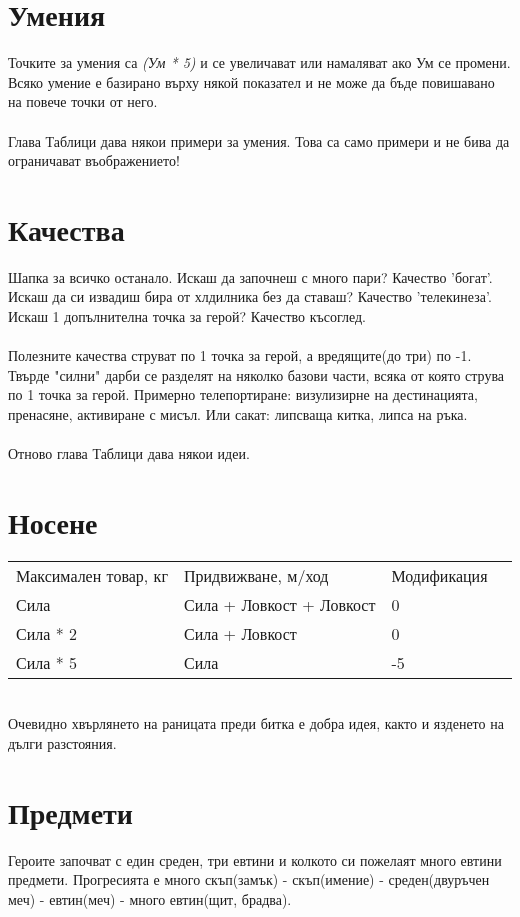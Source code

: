 \section{Умения}
Точките за умения са \textit{(Ум * 5)} и се увеличават или намаляват ако Ум се промени.
Всяко умение е базирано върху някой показател и не може да бъде повишавано на повече точки от него.
\\
\\
Глава Таблици дава някои примери за умения.
Това са само примери и не бива да ограничават въображението!


\section{Качества}
Шапка за всичко останало.
Искаш да започнеш с много пари? Качество 'богат'.
Искаш да си извадиш бира от хлдилника без да ставаш? Качество 'телекинеза'.
Искаш 1 допълнителна точка за герой? Качество късоглед.
\\
\\
Полезните качества струват по 1 точка за герой, а вредящите(до три) по -1.
Твърде "силни" дарби се разделят на няколко базови части, всяка от която струва по 1 точка за герой.
Примерно телепортиране: визулизирне на дестинацията, пренасяне, активиране с мисъл.
Или сакат: липсваща китка, липса на ръка.
\\
\\
Отново глава Таблици дава някои идеи.


\section{Носене}
\begin{tabular}{l | l | l | l }
Максимален товар, кг & Придвижване, м/ход       & Модификация  \\
Сила                 & Сила + Ловкост + Ловкост & 0            \\
Сила * 2             & Сила + Ловкост           & 0            \\
Сила * 5             & Сила                     & -5
\end{tabular}
\\
Очевидно хвърлянето на раницата преди битка е добра идея, както и язденето на дълги разстояния.


\section{Предмети}
Героите започват с един среден, три евтини и колкото си пожелаят много евтини предмети.
Прогресията е много скъп(замък) - скъп(имение) - среден(двуръчен меч) - евтин(меч) - много евтин(щит, брадва).

